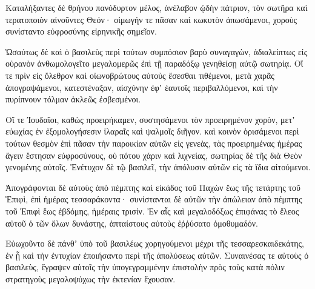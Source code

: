 {Καταλήξαντες δὲ θρήνου πανόδυρτον μέλος, ἀνέλαβον ᾠδὴν πάτριον, τὸν σωτῆρα καὶ τερατοποιὸν αἰνοῦντες Θεόν· οἰμωγήν τε πᾶσαν καὶ κωκυτὸν ἀπωσάμενοι, χοροὺς συνίσταντο εὐφροσύνης εἰρηνικῆς σημεῖον.
\par }{\PP {}Ὡσαύτως δὲ καὶ ὁ βασιλεὺς περὶ τούτων συμπόσιον βαρὺ συναγαγὼν, ἀδιαλείπτως εἰς οὐρανὸν ἀνθωμολογεῖτο μεγαλομερῶς ἐπὶ τῇ παραδόξῳ γενηθείσῃ αὐτῷ σωτηρίᾳ.
Οἵ τε πρὶν εἰς ὄλεθρον καὶ οἰωνοβρώτους αὐτοὺς ἔσεσθαι τιθέμενοι, μετὰ χαρᾶς ἀπογραψάμενοι, κατεστέναξαν, αἰσχύνην ἐφʼ ἑαυτοῖς περιβαλλόμενοι, καὶ τὴν πυρίπνουν τόλμαν ἀκλεῶς ἐσβεσμένοι.
\par }{\PP {}Οἵ τε Ἰουδαῖοι, καθὼς προειρήκαμεν, συστησάμενοι τὸν προειρημένον χορὸν, μετʼ εὐωχίας ἐν ἐξομολογήσεσιν ἱλαραῖς καὶ ψαλμοῖς διῆγον.
καὶ κοινὸν ὁρισάμενοι περὶ τούτων θεσμὸν ἐπὶ πᾶσαν τὴν παροικίαν αὐτῶν εἰς γενεὰς, τὰς προειρημένας ἡμέρας ἄγειν ἔστησαν εὐφροσύνους, οὐ πότου χάριν καὶ λιχνείας, σωτηρίας δὲ τῆς διὰ Θεὸν γενομένης αὐτοῖς.
Ἐνέτυχον δὲ τῷ βασιλεῖ, τὴν ἀπόλυσιν αὐτῶν εἰς τὰ ἴδια αἰτούμενοι.
\par }{\PP {}Ἀπογράφονται δὲ αὐτοὺς ἀπὸ πέμπτης καὶ εἰκάδος τοῦ Παχὼν ἕως τῆς τετάρτης τοῦ Ἐπιφὶ, ἐπὶ ἡμέρας τεσσαράκοντα· συνίστανται δὲ αὐτῶν τὴν ἀπώλειαν ἀπὸ πέμπτης τοῦ Ἐπιφὶ ἕως ἑβδόμης, ἡμέραις τρισίν.
Ἐν αἷς καὶ μεγαλοδόξως ἐπιφάνας τὸ ἔλεος αὐτοῦ ὁ τῶν ὅλων δυνάστης, ἀπταίστους αὐτοὺς ἐῤῥύσατο ὁμοθυμαδόν.
\par }{\PP {}Εὐωχοῦντο δὲ πάνθʼ ὑπὸ τοῦ βασιλέως χορηγούμενοι μέχρι τῆς τεσσαρεσκαιδεκάτης, ἐν ᾗ καὶ τὴν ἐντυχίαν ἐποιήσαντο περὶ τῆς ἀπολύσεως αὐτῶν.
Συναινέσας τε αὐτοὺς ὁ βασιλεὺς, ἔγραψεν αὐτοῖς τὴν ὑπογεγραμμένην ἐπιστολὴν πρὸς τοὺς κατὰ πόλιν στρατηγοὺς μεγαλοψύχως τὴν ἐκτενίαν ἔχουσαν.

}
